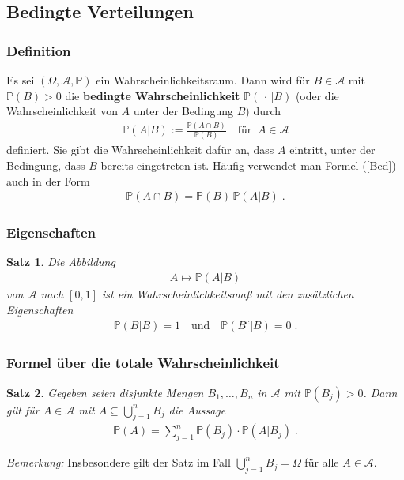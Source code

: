 \documentclass[ngerman,draft,parskip=half,twoside]{scrartcl}
\newtheorem{thm}{Satz}[section]
\newcommand*{\Algeb}{\mathcal{A}}   %
\newcommand*{\WKM}{\mathbb{P}}      %
\begin{document}
\subsection{Bedingte Verteilungen}
\subsubsection{Definition}
Es sei $(\Omega,\Algeb,\WKM)$ ein Wahrscheinlichkeitsraum. Dann wird
für $B\in \Algeb$ mit $\WKM(B)>0$ die \textbf{bedingte Wahrscheinlichkeit} $\WKM(\,\cdot\,|B)$
(oder die Wahrscheinlichkeit von $A$ unter der Bedingung $B$)
durch
\begin{gather}
\label{Bed}
 \WKM(A|B):=\frac{\WKM(A\cap B)}{\WKM(B)}\quad\mbox{für}\;\;A\in\Algeb
\end{gather}
definiert. Sie gibt die Wahrscheinlichkeit dafür an, dass $A$
eintritt, unter der Bedingung, dass $B$ bereits eingetreten ist. Häufig verwendet man
Formel (\ref{Bed}) auch in der Form
\begin{gather*}
  \WKM(A\cap B)= \WKM(B)\,\WKM(A|B)\;.
\end{gather*}
\subsubsection{Eigenschaften}
\begin{thm}
Die Abbildung
  \begin{gather*}
    A\mapsto \WKM(A|B)
  \end{gather*}
von $\Algeb$ nach $[0,1]$ ist ein Wahrscheinlichkeitsmaß mit den zusätzlichen Eigenschaften
  \begin{gather*}
    \WKM(B|B)=1\quad\mbox{und}\quad\WKM(B^c|B)=0\;.
  \end{gather*}
\end{thm}
\subsubsection{Formel über die totale Wahrscheinlichkeit}
\begin{thm}
\label{total}
Gegeben seien disjunkte Mengen $B_1,\ldots,B_n$ in $\Algeb$ mit
$\WKM(B_j)>0$. Dann gilt für $A\in \Algeb$ mit $A\subseteq\bigcup_{j=1}^n B_j$
die Aussage
  \begin{gather*}
    \WKM(A)=\sum_{j=1}^n\WKM(B_j)\cdot\WKM(A|B_j)\;.
  \end{gather*}
\end{thm}
\textit{Bemerkung:} Insbesondere gilt der Satz im Fall $\bigcup_{j=1}^n B_j=\Omega$
für alle $A\in\Algeb$.
\end{document}
